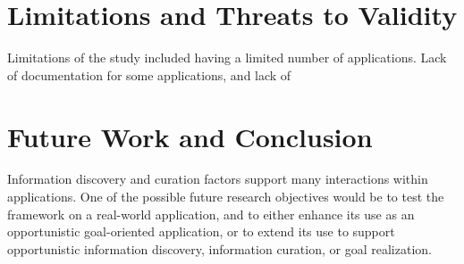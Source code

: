 \documentclass{casconpaper}
\begin{document}
{\section{Limitations and Threats to Validity}
Limitations of the study included having a limited number of applications. Lack of documentation for some applications, and lack of 
} %

{\section{ Future Work and Conclusion }
Information discovery and curation factors support many interactions within applications. One of the possible future research objectives would be to test the framework on a real-world application, and to either enhance its use as an opportunistic goal-oriented application, or to extend its use  to support opportunistic information discovery, information curation, or goal realization. 

} %
\end{document}
